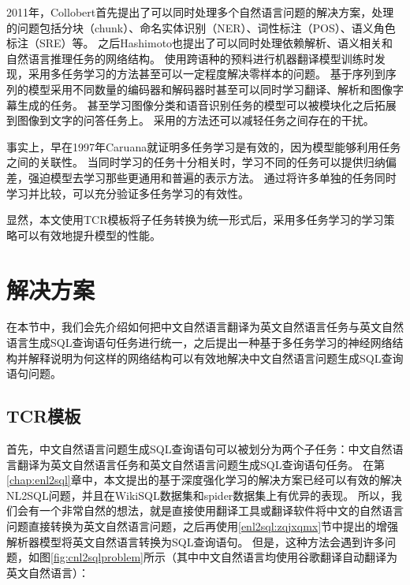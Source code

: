 2011年，Collobert\cite{collobert2011natural}首先提出了可以同时处理多个自然语言问题的解决方案，处理的问题包括分块（chunk）、命名实体识别（NER）、词性标注（POS）、语义角色标注（SRE）等。
之后Hashimoto\cite{hashimoto2017joint}也提出了可以同时处理依赖解析、语义相关和自然语言推理任务的网络结构。
使用跨语种的预料进行机器翻译模型训练时发现，采用多任务学习的方法\cite{johnson2017google}甚至可以一定程度解决零样本的问题。
基于序列到序列的模型采用不同数量的编码器和解码器时\cite{luong2015multi}甚至可以同时学习翻译、解析和图像字幕生成的任务。
甚至学习图像分类和语音识别任务的模型可以被模块化\cite{kaiser2017one}之后拓展到图像到文字的问答任务上\cite{xiong2016dynamic}。
采用\cite{ruder2017learning}的方法还可以减轻任务之间存在的干扰。

事实上，早在1997年Caruana\cite{caruana1997multitask}就证明多任务学习是有效的，因为模型能够利用任务之间的关联性。
当同时学习的任务十分相关时，学习不同的任务可以提供归纳偏差\cite{mitchell1980need}，强迫模型去学习那些更通用和普遍的表示方法。
通过将许多单独的任务同时学习并比较，可以充分验证多任务学习的有效性\cite{wang2018glue,poliak2018evaluation,poliak2018towards}。

显然，本文使用TCR模板将子任务转换为统一形式后，采用多任务学习的学习策略可以有效地提升模型的性能。 



\section{解决方案}

在本节中，我们会先介绍如何把中文自然语言翻译为英文自然语言任务与英文自然语言生成SQL查询语句任务进行统一，之后提出一种基于多任务学习的神经网络结构并解释说明为何这样的网络结构可以有效地解决中文自然语言问题生成SQL查询语句问题。

\subsection{TCR模板}

首先，中文自然语言问题生成SQL查询语句可以被划分为两个子任务：中文自然语言翻译为英文自然语言任务和英文自然语言问题生成SQL查询语句任务。
在第\ref{chap:enl2sql}章中，本文提出的基于深度强化学习的解决方案已经可以有效的解决NL2SQL问题，并且在WikiSQL数据集和spider数据集上有优异的表现。
所以，我们会有一个非常自然的想法，就是直接使用翻译工具或翻译软件将中文的自然语言问题直接转换为英文自然语言问题，之后再使用\ref{enl2sql:zqjxqmx}节中提出的增强解析器模型将英文自然语言转换为SQL查询语句。
但是，这种方法会遇到许多问题，如图\ref{fig:cnl2sqlproblem}所示（其中中文自然语言均使用谷歌翻译自动翻译为英文自然语言）：

